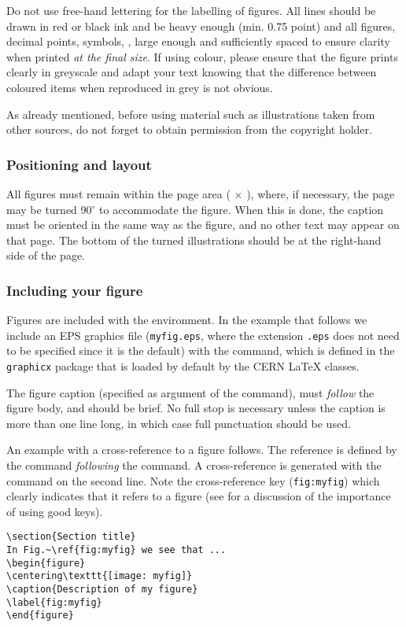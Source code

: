 \documentclass{cernrep}
\begin{document}
Do not use free-hand lettering for the labelling of figures. All lines
should be drawn in red or black ink and be heavy enough (min. 0.75
point) and all figures, decimal points, symbols, \etc, large enough
and sufficiently spaced to ensure clarity when printed \emph{at the
final size}. If using colour, please ensure that the figure prints
clearly in greyscale and adapt your text knowing that the difference
between coloured items when reproduced in grey is not obvious.

As already mentioned, before using material such as illustrations
taken from other sources, do not forget to obtain permission from the
copyright holder.

\subsubsection{Positioning and layout}

All figures must remain within the page area ( $\times$
), where, if necessary, the page may be turned 90$^\circ$
to accommodate the figure. When this is done, the caption must be
oriented in the same way as the figure, and no other text may appear
on that page.  The bottom of the turned illustrations should be at the
right-hand side of the page.

\subsubsection{Including your figure}

Figures are included with the  environment. In the
example that follows we include an EPS graphics file
(\texttt{myfig.eps}, where the extension \texttt{.eps} does not need
to be specified since it is the default) with the
 command, which is defined in the
\texttt{graphicx} package that is loaded by default by the CERN
\LaTeX{} classes.

The figure caption (specified as argument of the 
command), must \emph{follow} the figure body, and should be brief. No
full stop is necessary unless the caption is more than one line
long, in which case full punctuation should be used.


An example with a cross-reference to a figure follows. The reference
is defined by the  command \emph{following} the
 command. A cross-reference is generated with the
 command on the second line. Note the cross-reference key
(\texttt{fig:myfig}) which clearly indicates that it refers to a
figure (see  for a discussion of the importance of
using good keys).
\begin{verbatim}
\section{Section title}
In Fig.~\ref{fig:myfig} we see that ...
\begin{figure}
\centering\texttt{[image: myfig]}
\caption{Description of my figure}
\label{fig:myfig}
\end{figure}
\end{verbatim}
\end{document}
